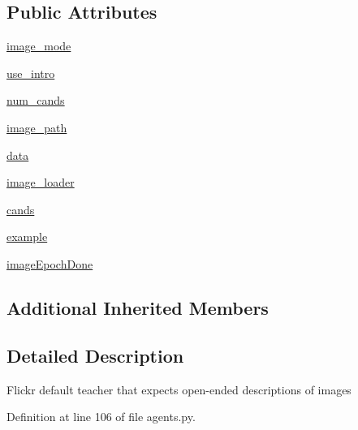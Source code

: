 \subsection*{Public Attributes}
\begin{DoxyCompactItemize}
\item 
\hyperlink{classparlai_1_1tasks_1_1flickr30k_1_1agents_1_1DefaultTeacher_a9172db25337a0e2c2c8348c0f2d63d69}{image\+\_\+mode}
\item 
\hyperlink{classparlai_1_1tasks_1_1flickr30k_1_1agents_1_1DefaultTeacher_a26c3c801b4cd7566cf554c6398e893ce}{use\+\_\+intro}
\item 
\hyperlink{classparlai_1_1tasks_1_1flickr30k_1_1agents_1_1DefaultTeacher_ab11d2ec093158073e7188bcc4170c56a}{num\+\_\+cands}
\item 
\hyperlink{classparlai_1_1tasks_1_1flickr30k_1_1agents_1_1DefaultTeacher_afbcd6505a2f71a7f55429ea316c2a7ea}{image\+\_\+path}
\item 
\hyperlink{classparlai_1_1tasks_1_1flickr30k_1_1agents_1_1DefaultTeacher_a91027d6545dc40fbd4ed09f34404d8e5}{data}
\item 
\hyperlink{classparlai_1_1tasks_1_1flickr30k_1_1agents_1_1DefaultTeacher_a10f2d48d9fabab085243366a708b8f9a}{image\+\_\+loader}
\item 
\hyperlink{classparlai_1_1tasks_1_1flickr30k_1_1agents_1_1DefaultTeacher_a2a1b276618cd9efb01b7b0f21ff338ec}{cands}
\item 
\hyperlink{classparlai_1_1tasks_1_1flickr30k_1_1agents_1_1DefaultTeacher_a541ebd56a221be4a71669e6ff799cf14}{example}
\item 
\hyperlink{classparlai_1_1tasks_1_1flickr30k_1_1agents_1_1DefaultTeacher_a5998c19d0306b5571d17aa38bbc22f73}{image\+Epoch\+Done}
\end{DoxyCompactItemize}
\subsection*{Additional Inherited Members}


\subsection{Detailed Description}
\begin{DoxyVerb}Flickr default teacher that expects open-ended descriptions of images
\end{DoxyVerb}
 

Definition at line 106 of file agents.\+py.



